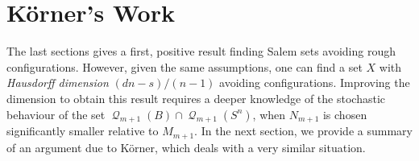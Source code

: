 \documentclass[12pt,reqno]{article}
\numberwithin{equation}{section}
\DeclareMathOperator{\DQ}{\mathcal{Q}}
\begin{document}
\section{K\"{o}rner's Work}

The last sections gives a first, positive result finding Salem sets avoiding rough configurations. However, given the same assumptions, one can find a set $X$ with \emph{Hausdorff dimension} $(dn - s)/(n-1)$ avoiding configurations. Improving the dimension to obtain this result requires a deeper knowledge of the stochastic behaviour of the set $\DQ_{m+1}(B) \cap \DQ_{m+1}(S^n)$, when $N_{m+1}$ is chosen significantly smaller relative to $M_{m+1}$. In the next section, we provide a summary of an argument due to K\"{o}rner, which deals with a very similar situation.
\end{document}
